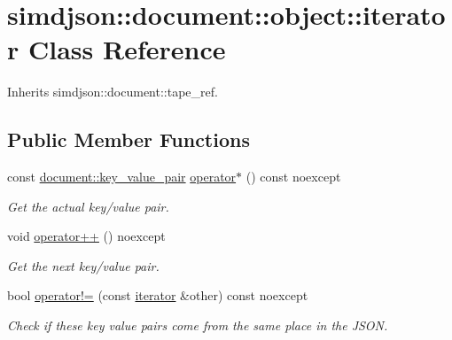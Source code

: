 \hypertarget{classsimdjson_1_1document_1_1object_1_1iterator}{}\section{simdjson\+:\+:document\+:\+:object\+:\+:iterator Class Reference}
\label{classsimdjson_1_1document_1_1object_1_1iterator}


Inherits simdjson\+::document\+::tape\+\_\+ref.

\subsection*{Public Member Functions}
\begin{DoxyCompactItemize}
\item 
\mbox{\label{classsimdjson_1_1document_1_1object_1_1iterator_a79de34f122872f0075c9d27cd7a820c5}} 
const \hyperlink{classsimdjson_1_1document_1_1key__value__pair}{document\+::key\+\_\+value\+\_\+pair} \hyperlink{classsimdjson_1_1document_1_1object_1_1iterator_a79de34f122872f0075c9d27cd7a820c5}{operator$\ast$} () const noexcept
\begin{DoxyCompactList}\small\item\em Get the actual key/value pair. \end{DoxyCompactList}\item 
void \hyperlink{classsimdjson_1_1document_1_1object_1_1iterator_a1a97b083023759d347a0bf103a6c0d10}{operator++} () noexcept
\begin{DoxyCompactList}\small\item\em Get the next key/value pair. \end{DoxyCompactList}\item 
bool \hyperlink{classsimdjson_1_1document_1_1object_1_1iterator_ad6cbc90bf14e9d0258cea88666f8e649}{operator!=} (const \hyperlink{classsimdjson_1_1document_1_1object_1_1iterator}{iterator} \&other) const noexcept
\begin{DoxyCompactList}\small\item\em Check if these key value pairs come from the same place in the J\+S\+ON. \end{DoxyCompactList}\item 
\mbox{\label{classsimdjson_1_1document_1_1object_1_1iterator_a7a012a54e058dd30fc53488f4efb0a13}} 

\end{DoxyCompactItemize}
